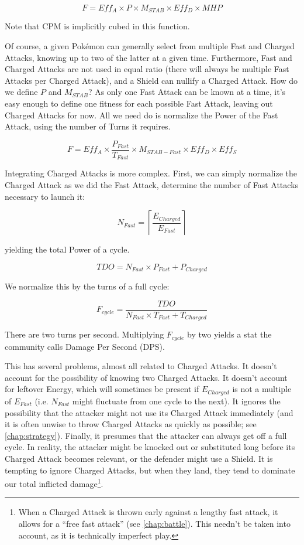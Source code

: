 \[ F = Eff_A \times P \times M_{STAB} \times Eff_D \times MHP \]

Note that CPM is implicitly cubed in this function.

Of course, a given Pokémon can generally select from multiple Fast and Charged Attacks,
  knowing up to two of the latter at a given time.
Furthermore, Fast and Charged Attacks are not used in equal ratio (there will
  always be multiple Fast Attacks per Charged Attack), and a Shield can
  nullify a Charged Attack.
How do we define $P$ and $M_{STAB}$?
As only one Fast Attack can be known at a time, it's easy enough to define one
  fitness for each possible Fast Attack, leaving out Charged Attacks for now.
All we need do is normalize the Power of the Fast Attack, using the number of
  Turns it requires.

\[ F = Eff_A \times \frac{P_{Fast}}{T_{Fast}} \times M_{STAB-Fast} \times Eff_D \times Eff_S \]

Integrating Charged Attacks is more complex.
First, we can simply normalize the Charged Attack as we did the Fast Attack,
 determine the number of Fast Attacks necessary to launch it:

\[ N_{Fast} = \left\lceil\frac{E_{Charged}}{E_{Fast}}\right\rceil \]

yielding the total Power of a cycle.

\[ TDO = N_{Fast} \times P_{Fast} + P_{Charged} \]

We normalize this by the turns of a full cycle:

\[ F_{cycle} = \frac{TDO}{N_{Fast} \times T_{Fast} + T_{Charged}} \]

There are two turns per second. Multiplying $F_{cycle}$ by two yields a
  stat the community calls Damage Per Second (DPS).

This has several problems, almost all related to Charged Attacks.
It doesn't account for the possibility of knowing two Charged Attacks.
It doesn't account for leftover Energy, which will sometimes be present if
  $E_{Charged}$ is not a multiple of $E_{Fast}$ (i.e. $N_{Fast}$
  might fluctuate from one cycle to the next).
It ignores the possibility that the attacker might not use its Charged Attack
  immediately (and it is often unwise to throw Charged Attacks as quickly as
  possible; see \autoref{chap:strategy}).
Finally, it presumes that the attacker can always get off a full cycle.
In reality, the attacker might be knocked out or substituted long before its
  Charged Attack becomes relevant, or the defender might use a Shield.
It is tempting to ignore Charged Attacks, but when they land, they tend to
  dominate our total inflicted damage\footnote{When a Charged Attack is thrown
  early against a lengthy fast attack, it allows for a ``free fast attack''
  (see \autoref{chap:battle}). This needn't be taken into account, as it is
  technically imperfect play.}.

